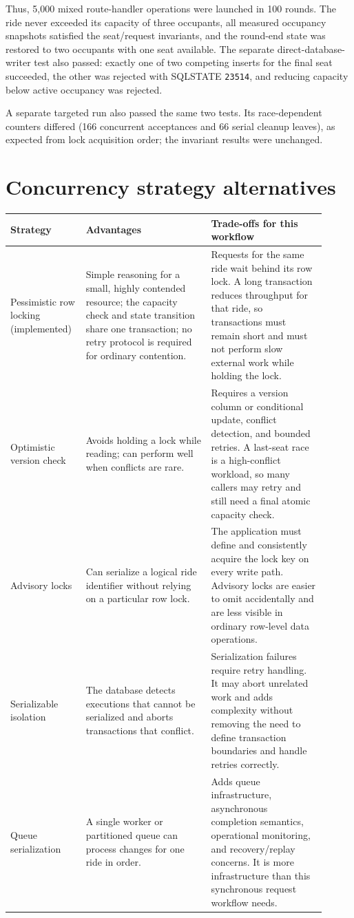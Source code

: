 \documentclass[11pt,a4paper]{article}
\begin{document}
Thus, 5,000 mixed route-handler operations were launched in 100 rounds. The ride never exceeded
its capacity of three occupants, all measured occupancy snapshots satisfied the seat/request
invariants, and the round-end state was restored to two occupants with one seat available. The
separate direct-database-writer test also passed: exactly one of two competing inserts for the
final seat succeeded, the other was rejected with SQLSTATE \texttt{23514}, and reducing capacity
below active occupancy was rejected.

A separate targeted run also passed the same two tests. Its race-dependent counters differed
(166 concurrent acceptances and 66 serial cleanup leaves), as expected from lock acquisition
order; the invariant results were unchanged.

\section{Concurrency strategy alternatives}

\begin{longtable}{p{0.20\linewidth}p{0.37\linewidth}p{0.34\linewidth}}
\toprule
\textbf{Strategy} & \textbf{Advantages} & \textbf{Trade-offs for this workflow}\\
\midrule
Pessimistic row locking (implemented) &
Simple reasoning for a small, highly contended resource; the capacity check and state transition
share one transaction; no retry protocol is required for ordinary contention. &
Requests for the same ride wait behind its row lock. A long transaction reduces throughput for
that ride, so transactions must remain short and must not perform slow external work while holding
the lock.\\
\addlinespace
Optimistic version check &
Avoids holding a lock while reading; can perform well when conflicts are rare. &
Requires a version column or conditional update, conflict detection, and bounded retries. A
last-seat race is a high-conflict workload, so many callers may retry and still need a final
atomic capacity check.\\
\addlinespace
Advisory locks &
Can serialize a logical ride identifier without relying on a particular row lock. &
The application must define and consistently acquire the lock key on every write path. Advisory
locks are easier to omit accidentally and are less visible in ordinary row-level data operations.\\
\addlinespace
Serializable isolation &
The database detects executions that cannot be serialized and aborts transactions that conflict. &
Serialization failures require retry handling. It may abort unrelated work and adds complexity
without removing the need to define transaction boundaries and handle retries correctly.\\
\addlinespace
Queue serialization &
A single worker or partitioned queue can process changes for one ride in order. &
Adds queue infrastructure, asynchronous completion semantics, operational monitoring, and
recovery/replay concerns. It is more infrastructure than this synchronous request workflow needs.\\
\bottomrule
\end{longtable}
\end{document}
